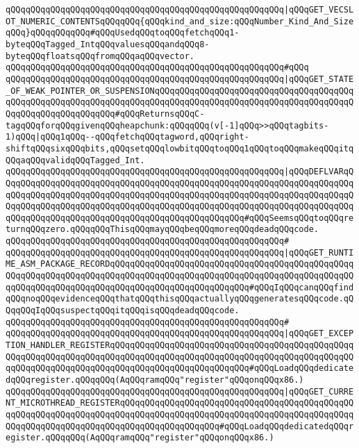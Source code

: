 \verb|qQQqqQQqqQQqqQQqqQQqqQQqqQQqqQQqqQQqqQQqqQQqqQQqqQQqqQQq|\verb#|qQQqGET_VECSLOT_NUMERIC_CONTENTSqQQqqQQq{qQQqkind_and_size:qQQqNumber_Kind_And_SizeqQQq}qQQqqQQqqQQq#\verb|#qQQqUsedqQQqtoqQQqfetchqQQq1-byteqQQqTagged_IntqQQqvaluesqQQqandqQQq8-byteqQQqfloatsqQQqfromqQQqaqQQqvector.|\newline
\verb|qQQqqQQqqQQqqQQqqQQqqQQqqQQqqQQqqQQqqQQqqQQqqQQqqQQqqQQq#qQQq|\newline
\verb|qQQqqQQqqQQqqQQqqQQqqQQqqQQqqQQqqQQqqQQqqQQqqQQqqQQqqQQq|\verb#|qQQqGET_STATE_OF_WEAK_POINTER_OR_SUSPENSIONqQQqqQQqqQQqqQQqqQQqqQQqqQQqqQQqqQQqqQQqqQQqqQQqqQQqqQQqqQQqqQQqqQQqqQQqqQQqqQQqqQQqqQQqqQQqqQQqqQQqqQQqqQQqqQQqqQQqqQQqqQQqqQQqqQQq#\verb|#qQQqReturnsqQQqC-tagqQQqforqQQqgivenqQQqheapchunk:qQQqqQQq(v[-1]qQQq>>qQQqtagbits-1)qQQq|\verb#|qQQq1qQQq--qQQqfetchqQQqtagword,qQQqright-shiftqQQqsixqQQqbits,qQQqsetqQQqlowbitqQQqtoqQQq1qQQqtoqQQqmakeqQQqitqQQqaqQQqvalidqQQqTagged_Int.#\newline
\verb|qQQqqQQqqQQqqQQqqQQqqQQqqQQqqQQqqQQqqQQqqQQqqQQqqQQqqQQq|\verb#|qQQqDEFLVARqQQqqQQqqQQqqQQqqQQqqQQqqQQqqQQqqQQqqQQqqQQqqQQqqQQqqQQqqQQqqQQqqQQqqQQqqQQqqQQqqQQqqQQqqQQqqQQqqQQqqQQqqQQqqQQqqQQqqQQqqQQqqQQqqQQqqQQqqQQqqQQqqQQqqQQqqQQqqQQqqQQqqQQqqQQqqQQqqQQqqQQqqQQqqQQqqQQqqQQqqQQqqQQqqQQqqQQqqQQqqQQqqQQqqQQqqQQqqQQqqQQqqQQqqQQqqQQqqQQq#\verb|#qQQqSeemsqQQqtoqQQqreturnqQQqzero.qQQqqQQqThisqQQqmayqQQqbeqQQqmoreqQQqdeadqQQqcode.|\newline
\verb|qQQqqQQqqQQqqQQqqQQqqQQqqQQqqQQqqQQqqQQqqQQqqQQqqQQqqQQq#|\newline
\verb|qQQqqQQqqQQqqQQqqQQqqQQqqQQqqQQqqQQqqQQqqQQqqQQqqQQqqQQq|\verb#|qQQqGET_RUNTIME_ASM_PACKAGE_RECORDqQQqqQQqqQQqqQQqqQQqqQQqqQQqqQQqqQQqqQQqqQQqqQQqqQQqqQQqqQQqqQQqqQQqqQQqqQQqqQQqqQQqqQQqqQQqqQQqqQQqqQQqqQQqqQQqqQQqqQQqqQQqqQQqqQQqqQQqqQQqqQQqqQQqqQQqqQQqqQQqqQQqqQQq#\verb|#qQQqIqQQqcanqQQqfindqQQqnoqQQqevidenceqQQqthatqQQqthisqQQqactuallyqQQqgeneratesqQQqcode.qQQqqQQqIqQQqsuspectqQQqitqQQqisqQQqdeadqQQqcode.|\newline
\verb|qQQqqQQqqQQqqQQqqQQqqQQqqQQqqQQqqQQqqQQqqQQqqQQqqQQqqQQq#|\newline
\verb|qQQqqQQqqQQqqQQqqQQqqQQqqQQqqQQqqQQqqQQqqQQqqQQqqQQqqQQq|\verb#|qQQqGET_EXCEPTION_HANDLER_REGISTERqQQqqQQqqQQqqQQqqQQqqQQqqQQqqQQqqQQqqQQqqQQqqQQqqQQqqQQqqQQqqQQqqQQqqQQqqQQqqQQqqQQqqQQqqQQqqQQqqQQqqQQqqQQqqQQqqQQqqQQqqQQqqQQqqQQqqQQqqQQqqQQqqQQqqQQqqQQqqQQqqQQqqQQq#\verb|#qQQqLoadqQQqdedicatedqQQqregister.qQQqqQQq(AqQQqramqQQq"register"qQQqonqQQqx86.)|\newline
\verb|qQQqqQQqqQQqqQQqqQQqqQQqqQQqqQQqqQQqqQQqqQQqqQQqqQQqqQQq|\verb#|qQQqGET_CURRENT_MICROTHREAD_REGISTERqQQqqQQqqQQqqQQqqQQqqQQqqQQqqQQqqQQqqQQqqQQqqQQqqQQqqQQqqQQqqQQqqQQqqQQqqQQqqQQqqQQqqQQqqQQqqQQqqQQqqQQqqQQqqQQqqQQqqQQqqQQqqQQqqQQqqQQqqQQqqQQqqQQqqQQqqQQqqQQq#\verb|#qQQqLoadqQQqdedicatedqQQqregister.qQQqqQQq(AqQQqramqQQq"register"qQQqonqQQqx86.)|\newline
